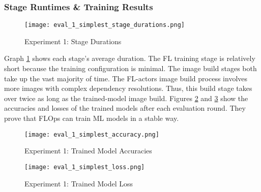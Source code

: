 \subsubsection{Stage Runtimes \& Training Results}

\begin{figure}[h]
    \begin{adjustwidth}{-0.2\paperwidth}{-0.2\paperwidth}
        \centering
        \texttt{[image: eval\_1\_simplest\_stage\_durations.png]}
        \caption{Experiment 1: Stage Durations}
        \label{fig:eval_1_simplest_stage_durations}
    \end{adjustwidth}
\end{figure}

Graph \ref{fig:eval_1_simplest_stage_durations} shows each stage's average duration.
The FL training stage is relatively short because the training configuration is minimal.
The image build stages both take up the vast majority of time.
The FL-actors image build process involves more images with complex dependency resolutions.
Thus, this build stage takes over twice as long as the trained-model image build.
Figures \ref{fig:eval_1_simplest_accuracies} and \ref{fig:eval_1_simplest_loss} show the accuracies and losses of the trained models after each evaluation round.
They prove that FLOps can train ML models in a stable way.

\begin{figure}[H]
    \centering
    \texttt{[image: eval\_1\_simplest\_accuracy.png]}
    \caption{Experiment 1: Trained Model Accuracies}
    \label{fig:eval_1_simplest_accuracies}
\end{figure}

\begin{figure}[H]
    \centering
    \texttt{[image: eval\_1\_simplest\_loss.png]}
    \caption{Experiment 1: Trained Model Loss}
    \label{fig:eval_1_simplest_loss}
\end{figure}

